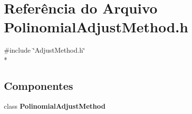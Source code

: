 \section{Referência do Arquivo Polinomial\+Adjust\+Method.\+h}
\label{_polinomial_adjust_method_8h}
{\ttfamily \#include \char`\"{}Adjust\+Method.\+h\char`\"{}}\\*
\subsection*{Componentes}
\begin{DoxyCompactItemize}
\item 
class {\bf Polinomial\+Adjust\+Method}
\end{DoxyCompactItemize}
